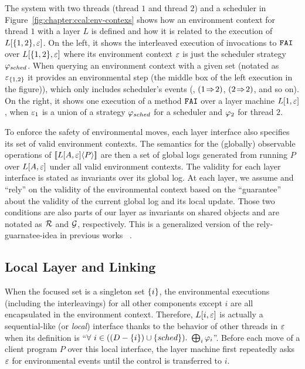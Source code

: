 The system with two threads
(thread $1$ and thread $2$) and a scheduler in Figure~\ref{fig:chapter:ccal:env-contexs}
shows how
an environment context for  thread $1$  with a layer $L$ is defined 
and how it is related to the execution of  $L[\{1,2\}, {\varepsilon}]$.
On the left, it shows the interleaved execution of
 invocations to ${\mathrm{\texttt{FAI}}}$ over $L[\{1, 2\}, {\varepsilon}]$
where its environment context ${\varepsilon}$ is just the scheduler
strategy $\varphi_{sched}$.
When querying an environment context with a given set (notated as ${\varepsilon}_{\{1, 2\}}$
it provides an environmental step (the middle box of the left execution in the figure)),
which only includes scheduler's events (\eg, $(1 \!\Rightarrow\! 2)$, $(2 \!\Rightarrow\! 2)$, and so on).
On the right, it shows one execution
of a method ${\mathrm{\texttt{FAI}}}$ over a layer machine $L[1, {\varepsilon}]$, when ${\varepsilon}_1$ is a union of
a strategy $\varphi_{sched}$ for a scheduler and $\varphi_{2}$ for
thread $2$. 

To enforce the safety of environmental moves,
each layer interface also specifies its set of valid environment contexts.
The semantics for the (globally) observable operations of $[\![{L[A, {\varepsilon}]} \langle {P} \rangle]\!]$ are then a set of global logs
generated from running $P$ over $L[A, {\varepsilon}]$ under all valid
environment contexts. 
The validity for each layer interface is stated as invariants over its global log. 
At each layer, we assume and ``rely''  on the validity of the environmental context based on the ``guarantee'' about the validity of the current global log and its local update.
Those two conditions are also parts of our layer as invariants on shared objects and are notated as 
$\mathcal{R}$ and  $\mathcal{G}$, respectively.
This is a generalized version of the rely-guarnatee-idea in previous works ~\cite{feng07:sagl,vafeiadis:marriage,LRG,fu10:roch,sergey15}. 


\subsection{Local Layer and Linking}
\label{chapter:ccal:subsec:local-layer-with-environmental-context-and-local-layer-linking}
 
When the focused set is a singleton set $\{i\}$,
the environmental executions (including the interleavings) for all other components except $i$ are all encapsulated in the environment
context.
Therefore,  $L[i, {\varepsilon}]$ is actually a sequential-like (or \emph{local}) interface thanks to the behavior of other threads in ${\varepsilon}$ when
its definition is ``$\forall\ i \in ((D - \set{i}) \cup \set{sched}) .\ \bigoplus_{i} \strat{i}$''.
Before each move of a client program $P$ over this local interface, 
the layer machine first repeatedly asks ${\varepsilon}$ for environmental events until the control is transferred to $i$. 


